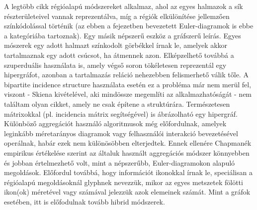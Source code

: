 A legtöbb cikk régióalapú módszereket alkalmaz, ahol az egyes halmazok a sík részterületeivel vannak reprezentálva, míg a régiók elkülönítése jellemzően színkódolással történik\cite{eulerape, euler_polygon_article, simonetto_undrawable} (az ebben a fejezetben bevezetett Euler-diagramok is ebbe a kategóriába tartoznak). Egy másik népszerű eszköz a gráfszerű leírás. Egyes mószerek egy adott halmazt színkodolt görbékkel írnak le, amelyek akkor tartalmaznak egy adott csúcsot, ha átmennek azon\cite{linesets}. Elképzelhető továbbá a szuperduális használata is, amely végső soron tökéletesen reprezentál egy hipergráfot, azonban a tartalmazás reláció nehezebben felismerhető válik tőle. A bipartite incidence structure használata esetén ez a probléma már nem merül fel, viszont - Skiena kivételével, aki mindössze megemlíti az alkalmazhatóságát\cite{bpis_vis} - nem találtam olyan cikket, amely ne csak építene a struktúrára. Természetesen mátrixokkal (pl. incidencia mátrix segítségével) is ábrázolható egy hipergráf. Különböző aggregációt használó algoritmusok még előfordulnak, amelyek leginkább méretarányos diagramok vagy felhasználói interakció bevezetésével operálnak\cite{wellmatched_important, interactive_sets}, habár ezek nem különösöbben elterjedtek. Ennek ellenére Chapmanék empirikus értékelése szerint az általuk használt aggregációs módszer könnyebben és jobban értelmezhető volt, mint a népszerűbb, Euler-diagramokon alapuló megoldások\cite{wellmatched_important}. Előfordul továbbá, hogy információt ikonokkal írnak le, speciálisan a régióalapú megoldásoknál glyphnek nevezzük, mikor az egyes metszetek fölötti ikon(ok) méretével vagy számával jelezzük azok elemeinek számát. Mint a gráfok esetében, itt is előfodulnak tovább hibrid módszerek.



